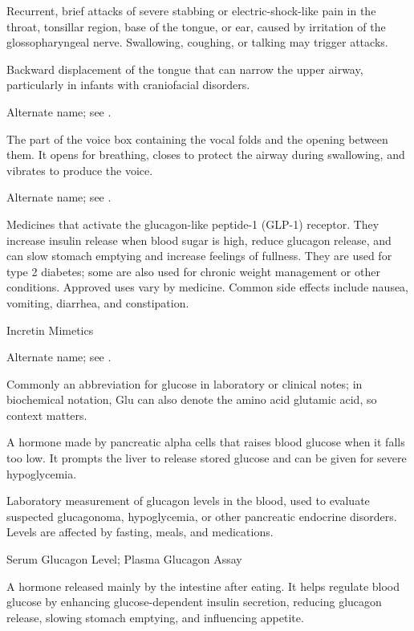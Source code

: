  Recurrent, brief attacks of severe stabbing or electric-shock-like pain in the throat,
tonsillar region, base of the tongue, or ear, caused by irritation of the
glossopharyngeal nerve. Swallowing, coughing, or talking may trigger attacks.

 Backward displacement of the tongue that can narrow the upper airway, particularly in infants with craniofacial disorders.

 Alternate name; see .

 The part of the voice box containing the vocal folds and the opening between them. It opens for breathing, closes to protect the airway during swallowing, and vibrates to produce the voice.

 Alternate name; see .

 Medicines that activate the glucagon-like peptide-1 (GLP-1) receptor. They increase insulin release when blood sugar is high, reduce glucagon release, and can slow stomach emptying and increase feelings of fullness. They are used for type 2 diabetes; some are also used for chronic weight management or other conditions. Approved uses vary by medicine. Common side effects include nausea, vomiting, diarrhea, and constipation.

\synonyms
Incretin Mimetics

 Alternate name; see .

 Commonly an abbreviation for glucose in laboratory or clinical notes; in biochemical notation, Glu can also denote the amino acid glutamic acid, so context matters.

 A hormone made by pancreatic alpha cells that raises blood glucose when it falls too low. It prompts the liver to release stored glucose and can be given for severe hypoglycemia.

 Laboratory measurement of glucagon levels in the blood, used to evaluate suspected glucagonoma, hypoglycemia, or other pancreatic endocrine disorders. Levels are affected by fasting, meals, and medications.

\synonyms
Serum Glucagon Level; Plasma Glucagon Assay

 A hormone released mainly by the intestine after eating. It helps regulate blood glucose by enhancing glucose-dependent insulin secretion, reducing glucagon release, slowing stomach emptying, and influencing appetite.

